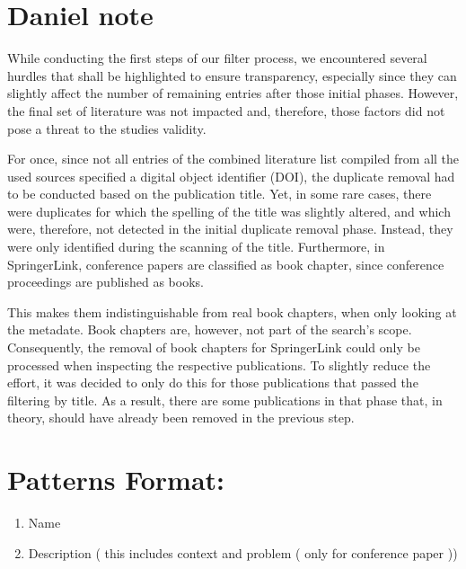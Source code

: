 \documentclass{article}
\theoremstyle{mytheoremstyle}
\theoremstyle{mytheoremstyle}
\theoremstyle{myproblemstyle}
\begin{document}
    \section{Daniel note}

    While conducting the first steps of our filter process, we encountered several hurdles that shall be highlighted to ensure transparency, especially since they can slightly affect the number of remaining entries after those initial phases. However, the final set of literature was not impacted and, therefore, those factors did not pose a threat to the studies validity.

For once, since not all entries of the combined literature list compiled from all the used sources specified a digital object identifier (DOI), the duplicate removal had to be conducted based on the publication title. Yet, in some rare cases, there were duplicates for which the spelling of the title was slightly altered, and which were, therefore, not detected in the initial duplicate removal phase. Instead, they were only identified during the scanning of the title. Furthermore, in SpringerLink, conference papers are classified as book chapter, since conference proceedings are published as books.

This makes them indistinguishable from real book chapters, when only looking at the metadate. Book chapters are, however, not part of the search’s scope. Consequently, the removal of book chapters for SpringerLink could only be processed when inspecting the respective publications. To slightly reduce the effort, it was decided to only do this for those publications that passed the filtering by title. As a result, there are some publications in that phase that, in theory, should have already been removed in the previous step.


\section{Patterns Format:}

\begin{enumerate}
  \item Name
  \item Description ( this includes context and problem ( only for conference paper ))
\end{enumerate}
\end{document}
